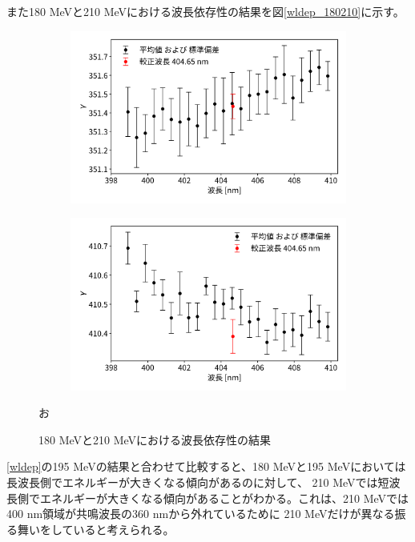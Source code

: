 \documentclass[a4paper,11pt,uplatex]{jsbook}
\begin{document}
また180 MeVと210 MeVにおける波長依存性の結果を図\ref{wldep_180210}に示す。
\begin{figure}
  \begin{subfigure}[h]{0.45\linewidth}
    \centering
    \includegraphics[width = \linewidth]{image/4-wldep180.png}
  \end{subfigure}
  \begin{subfigure}[h]{0.45\linewidth}
    \centering
    \includegraphics[width = \linewidth]{image/4-wldep210.png}
  \end{subfigure}
  \caption{180 MeVと210 MeVにおける波長依存性の結果}お
\end{figure}
\ref{wldep}の195 MeVの結果と合わせて比較すると、180 MeVと195 MeVにおいては長波長側でエネルギーが大きくなる傾向があるのに対して、
210 MeVでは短波長側でエネルギーが大きくなる傾向があることがわかる。これは、210 MeVでは400 nm領域が共鳴波長の360 nmから外れているために
210 MeVだけが異なる振る舞いをしていると考えられる。
\end{document}

